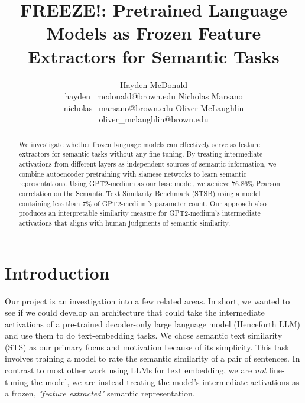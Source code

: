 \documentclass{article}
\title{FREEZE!: Pretrained Language Models as Frozen Feature Extractors for Semantic Tasks}
\author{
    Hayden McDonald\\hayden\_mcdonald@brown.edu \And
    Nicholas Marsano\\nicholas\_marsano@brown.edu\And
    Oliver McLaughlin\\oliver\_mclaughlin@brown.edu
}
\begin{document}
\maketitle

\begin{abstract}
    We investigate whether frozen language models can effectively serve as feature extractors for semantic tasks without any fine-tuning. By treating intermediate activations from different layers as independent sources of semantic information, we combine autoencoder pretraining with siamese networks to learn semantic representations. Using GPT2-medium as our base model, we achieve 76.86\% Pearson correlation on the Semantic Text Similarity Benchmark (STSB) using a model containing less than 7\% of GPT2-medium's parameter count. Our approach also produces an interpretable similarity measure for GPT2-medium's intermediate activations that aligns with human judgments of semantic similarity.
\end{abstract}

\section{Introduction}
Our project is an investigation into a few related areas. In short, we wanted to see if we could develop an architecture that could take the intermediate activations of a pre-trained decoder-only large language model (Henceforth LLM) and use them to do text-embedding tasks. We chose semantic text similarity (STS) as our primary focus and motivation because of its simplicity. This task involves training a model to rate the semantic similarity of a pair of sentences. In contrast to most other work using LLMs for text embedding, we are \textit{not} fine-tuning the model, we are instead treating the model's intermediate activations as a frozen, \textit{"feature extracted"} semantic representation.
\end{document}
